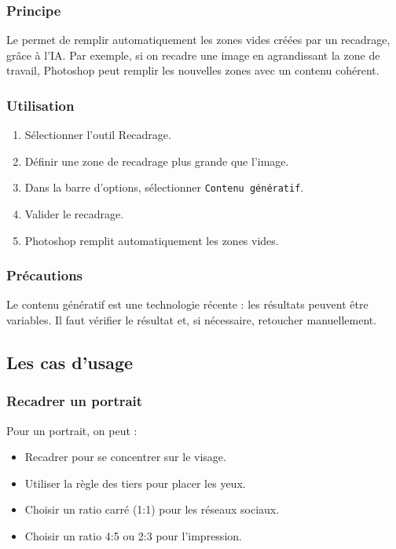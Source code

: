 \subsubsection{Principe}

Le  permet de remplir automatiquement les zones vides créées par un recadrage, grâce à l'IA. Par exemple, si on recadre une image en agrandissant la zone de travail, Photoshop peut remplir les nouvelles zones avec un contenu cohérent.

\subsubsection{Utilisation}

\begin{enumerate}
    \item Sélectionner l'outil Recadrage.
    \item Définir une zone de recadrage plus grande que l'image.
    \item Dans la barre d'options, sélectionner \texttt{Contenu génératif}.
    \item Valider le recadrage.
    \item Photoshop remplit automatiquement les zones vides.
\end{enumerate}

\subsubsection{Précautions}

Le contenu génératif est une technologie récente : les résultats peuvent être variables. Il faut vérifier le résultat et, si nécessaire, retoucher manuellement.

\subsection{Les cas d'usage}

\subsubsection{Recadrer un portrait}

Pour un portrait, on peut :

\begin{itemize}
    \item Recadrer pour se concentrer sur le visage.
    \item Utiliser la règle des tiers pour placer les yeux.
    \item Choisir un ratio carré (1:1) pour les réseaux sociaux.
    \item Choisir un ratio 4:5 ou 2:3 pour l'impression.
\end{itemize}

